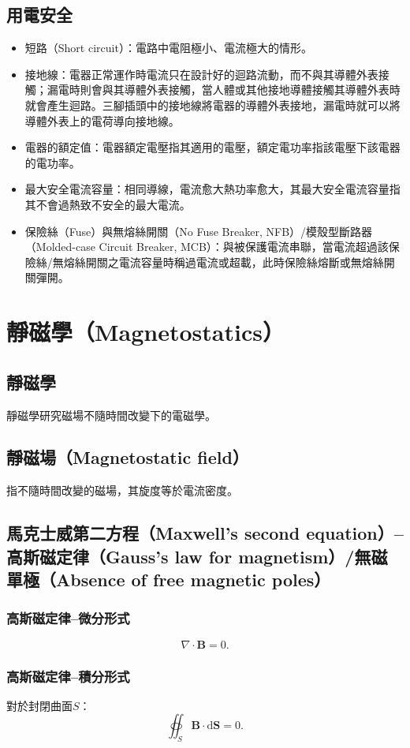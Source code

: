\documentclass[a4paper,12pt]{report}
\begin{document}
\begin{itemize}
\subsection{用電安全}
\begin{itemize}
\item 短路（Short circuit）：電路中電阻極小、電流極大的情形。
\item 接地線：電器正常運作時電流只在設計好的迴路流動，而不與其導體外表接觸；漏電時則會與其導體外表接觸，當人體或其他接地導體接觸其導體外表時就會產生迴路。三腳插頭中的接地線將電器的導體外表接地，漏電時就可以將導體外表上的電荷導向接地線。
\item 電器的額定值：電器額定電壓指其適用的電壓，額定電功率指該電壓下該電器的電功率。
\item 最大安全電流容量：相同導線，電流愈大熱功率愈大，其最大安全電流容量指其不會過熱致不安全的最大電流。
\item 保險絲（Fuse）與無熔絲開關（No Fuse Breaker, NFB）/模殼型斷路器（Molded-case Circuit Breaker, MCB）：與被保護電流串聯，當電流超過該保險絲/無熔絲開關之電流容量時稱過電流或超載，此時保險絲熔斷或無熔絲開關彈開。
\end{itemize}


\section{靜磁學（Magnetostatics）}
\subsection{靜磁學}
靜磁學研究磁場不隨時間改變下的電磁學。
\subsection{靜磁場（Magnetostatic field）}
指不隨時間改變的磁場，其旋度等於電流密度。
\subsection{馬克士威第二方程（Maxwell's second equation）–高斯磁定律（Gauss's law for magnetism）/無磁單極（Absence of free magnetic poles）}
\subsubsection{高斯磁定律–微分形式}
\[\nabla \cdot \mathbf{B} = 0.\]
\subsubsection{高斯磁定律–積分形式}
對於封閉曲面$S$：
\[\oiint_S\mathbf{B}\cdot\mathrm{d}\mathbf{S}=0.\]

\end{itemize}
\end{document}
